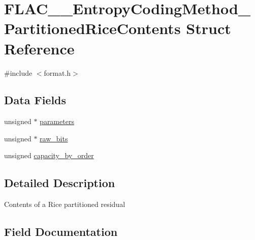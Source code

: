 \hypertarget{struct_f_l_a_c_____entropy_coding_method___partitioned_rice_contents}{}\section{F\+L\+A\+C\+\_\+\+\_\+\+Entropy\+Coding\+Method\+\_\+\+Partitioned\+Rice\+Contents Struct Reference}
\label{struct_f_l_a_c_____entropy_coding_method___partitioned_rice_contents}


{\ttfamily \#include $<$format.\+h$>$}

\subsection*{Data Fields}
\begin{DoxyCompactItemize}
\item 
unsigned $\ast$ \hyperlink{struct_f_l_a_c_____entropy_coding_method___partitioned_rice_contents_a06e97d40923f195410a65da9311ab6a2}{parameters}
\item 
unsigned $\ast$ \hyperlink{struct_f_l_a_c_____entropy_coding_method___partitioned_rice_contents_a915eb5369d39924bc29c948c29834279}{raw\+\_\+bits}
\item 
unsigned \hyperlink{struct_f_l_a_c_____entropy_coding_method___partitioned_rice_contents_abb60aca8d98bf9299558f230dfe83bc1}{capacity\+\_\+by\+\_\+order}
\end{DoxyCompactItemize}


\subsection{Detailed Description}
Contents of a Rice partitioned residual 

\subsection{Field Documentation}
\mbox{\label{struct_f_l_a_c_____entropy_coding_method___partitioned_rice_contents_abb60aca8d98bf9299558f230dfe83bc1}} 
